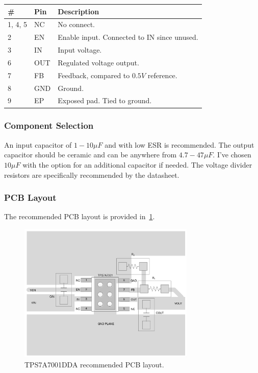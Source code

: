 \label{tab:tps7a7001dda-pinout}
\begin{tabularx}{\textwidth}{l l X}
        \caption{TPS7A7001DDA pinout.}                                \\
        \toprule
        \#      & Pin & Description                                   \\
        \midrule
        1, 4, 5 & NC  & No connect.                                   \\
        2       & EN  & Enable input. Connected to IN since unused.   \\
        3       & IN  & Input voltage.                                \\
        6       & OUT & Regulated voltage output.                     \\
        7       & FB  & Feedback, compared to $0.5 \si{V}$ reference. \\
        8       & GND & Ground.                                       \\
        9       & EP  & Exposed pad. Tied to ground.                  \\
        \bottomrule
\end{tabularx}

\subsubsection{Component Selection}
\label{sec:tps7a7001dda-component-selection}

An input capacitor of $1 - 10 \si{\mu F}$ and with low ESR is recommended. The output capacitor
should be ceramic and can be anywhere from $4.7 - 47 \si{\mu F}$. I've chosen $10 \si{\mu F}$ with
the option for an additional capacitor if needed. The voltage divider resistors are specifically
recommended by the datasheet.

\subsubsection{PCB Layout}
\label{sec:tps7a7001dda-pcb}

The recommended PCB layout is provided in~\ref{fig:tps7a7001dda-pcb}.

\begin{figure}[h]
        \centering
        \includegraphics[width=0.75\textwidth]{data/tps7a7001dda-pcb}
        \caption{TPS7A7001DDA recommended PCB layout.}
        \label{fig:tps7a7001dda-pcb}
\end{figure}

